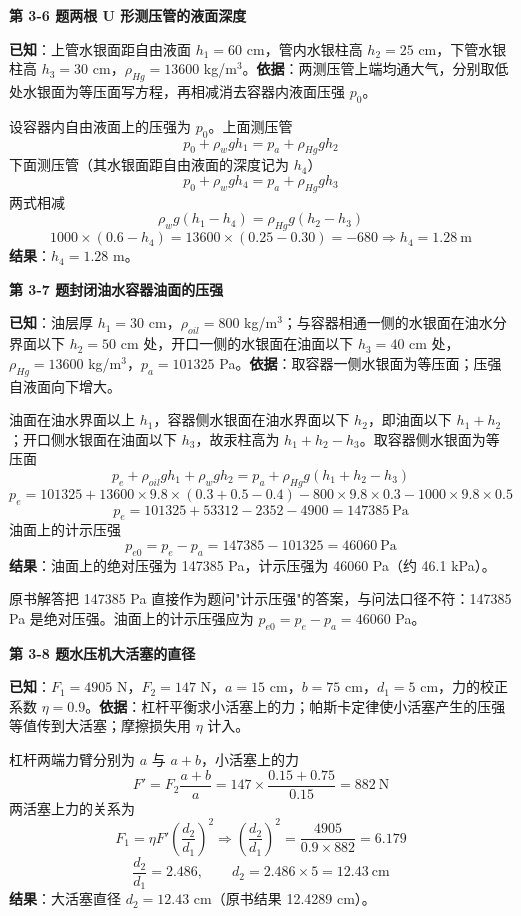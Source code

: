 \noindent\textbf{第 3-6 题\quad 两根 U 形测压管的液面深度}

\begin{jie}
\textbf{已知}：上管水银面距自由液面 $h_1=60$ cm，管内水银柱高 $h_2=25$ cm，下管水银柱高 $h_3=30$ cm，$\rho_{Hg}=13600$ kg/m$^3$。\textbf{依据}：两测压管上端均通大气，分别取低处水银面为等压面写方程，再相减消去容器内液面压强 $p_0$。

设容器内自由液面上的压强为 $p_0$。上面测压管
\[ p_0+\rho_w gh_1=p_a+\rho_{Hg}gh_2 \]
下面测压管（其水银面距自由液面的深度记为 $h_4$）
\[ p_0+\rho_w gh_4=p_a+\rho_{Hg}gh_3 \]
两式相减
\[ \rho_w g(h_1-h_4)=\rho_{Hg}g(h_2-h_3) \]
\[ 1000\times(0.6-h_4)=13600\times(0.25-0.30)=-680\Rightarrow h_4=1.28\ \mathrm{m} \]
\textbf{结果}：$h_4=1.28$ m。
\end{jie}

\noindent\textbf{第 3-7 题\quad 封闭油水容器油面的压强}

\begin{jie}
\textbf{已知}：油层厚 $h_1=30$ cm，$\rho_{oil}=800$ kg/m$^3$；与容器相通一侧的水银面在油水分界面以下 $h_2=50$ cm 处，开口一侧的水银面在油面以下 $h_3=40$ cm 处，$\rho_{Hg}=13600$ kg/m$^3$，$p_a=101325$ Pa。\textbf{依据}：取容器一侧水银面为等压面；压强自液面向下增大。

油面在油水界面以上 $h_1$，容器侧水银面在油水界面以下 $h_2$，即油面以下 $h_1+h_2$；开口侧水银面在油面以下 $h_3$，故汞柱高为 $h_1+h_2-h_3$。取容器侧水银面为等压面
\[ p_e+\rho_{oil}gh_1+\rho_w gh_2=p_a+\rho_{Hg}g(h_1+h_2-h_3) \]
\[ p_e=101325+13600\times9.8\times(0.3+0.5-0.4)-800\times9.8\times0.3-1000\times9.8\times0.5 \]
\[ p_e=101325+53312-2352-4900=147385\ \mathrm{Pa} \]
油面上的计示压强
\[ p_{e0}=p_e-p_a=147385-101325=46060\ \mathrm{Pa} \]
\textbf{结果}：油面上的绝对压强为 147385 Pa，计示压强为 46060 Pa（约 46.1 kPa）。
\end{jie}

\begin{yicuo}
原书解答把 147385 Pa 直接作为题问"计示压强"的答案，与问法口径不符：147385 Pa 是绝对压强。油面上的计示压强应为 $p_{e0}=p_e-p_a=46060$ Pa。
\end{yicuo}

\noindent\textbf{第 3-8 题\quad 水压机大活塞的直径}

\begin{jie}
\textbf{已知}：$F_1=4905$ N，$F_2=147$ N，$a=15$ cm，$b=75$ cm，$d_1=5$ cm，力的校正系数 $\eta=0.9$。\textbf{依据}：杠杆平衡求小活塞上的力；帕斯卡定律使小活塞产生的压强等值传到大活塞；摩擦损失用 $\eta$ 计入。

杠杆两端力臂分别为 $a$ 与 $a+b$，小活塞上的力
\[ F'=F_2\frac{a+b}{a}=147\times\frac{0.15+0.75}{0.15}=882\ \mathrm{N} \]
两活塞上力的关系为
\[ F_1=\eta F'\left(\frac{d_2}{d_1}\right)^2\Rightarrow\left(\frac{d_2}{d_1}\right)^2=\frac{4905}{0.9\times882}=6.179 \]
\[ \frac{d_2}{d_1}=2.486,\qquad d_2=2.486\times5=12.43\ \mathrm{cm} \]
\textbf{结果}：大活塞直径 $d_2=12.43$ cm（原书结果 12.4289 cm）。
\end{jie}

